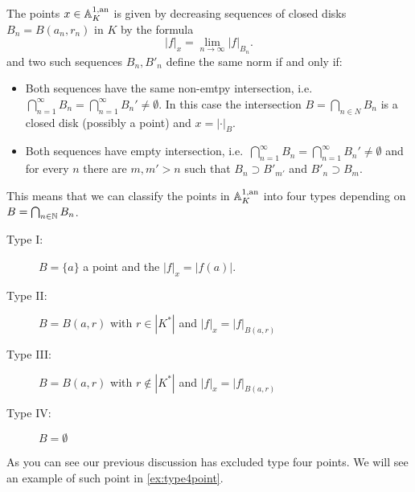 \begin{theorem}
	 
	The points $x \in \mathbb{A}_K^{1,\text{an}}$ is given by decreasing sequences of closed disks $B_n = B(a_n, r_n)$ in $K$ by the formula \[
	|f|_x = \lim_{n \to \infty} |f|_{B_n}
	.\] 
	and two such sequences $B_n, B'_n$ define the same norm if and only if:
	 \begin{itemize}
		\item Both sequences have the same non-emtpy intersection, i.e.\ $\bigcap_{n = 1}^{\infty} B_n = \bigcap_{n = 1}^{\infty} B_n' \ne \emptyset$. 
			In this case the intersection $B = \bigcap_{n \in N} B_n$ is a closed disk (possibly a point) and $x = |\cdot |_B$. 
		\item Both sequences have empty intersection, i.e.\ $\bigcap_{n = 1}^{\infty} B_n = \bigcap_{n = 1}^{\infty} B_n' \ne \emptyset$  and for every $n$ there are $m, m'> n$ such that $B_n \supset  B'_{m'}$  and $B'_n \supset B_m $.
	\end{itemize}
	This means that we can classify the points in $\mathbb{A} ^{1,\text{an}}_K$ into four types depending on $B = \bigcap_{n \in \mathbb{N}} B_n$. 
	\begin{description}
		\item[Type I:] $B = \{a\} $ a point and the $|f|_x = |f(a)|$. 
		\item[Type II:] $B = B(a, r)$ with $r \in |K^* |$ and $|f|_x = |f|_{B(a, r)}$
		\item[Type III:] $B = B (a, r)$ with $r \not\in |K^*|$ and $|f|_x = |f|_{B(a, r)}$
		\item[Type IV:] $B = \emptyset$
	\end{description}
\end{theorem}
As you can see our previous discussion has excluded type four points. We will see an example of such point in \cref{ex:type4point}. 

